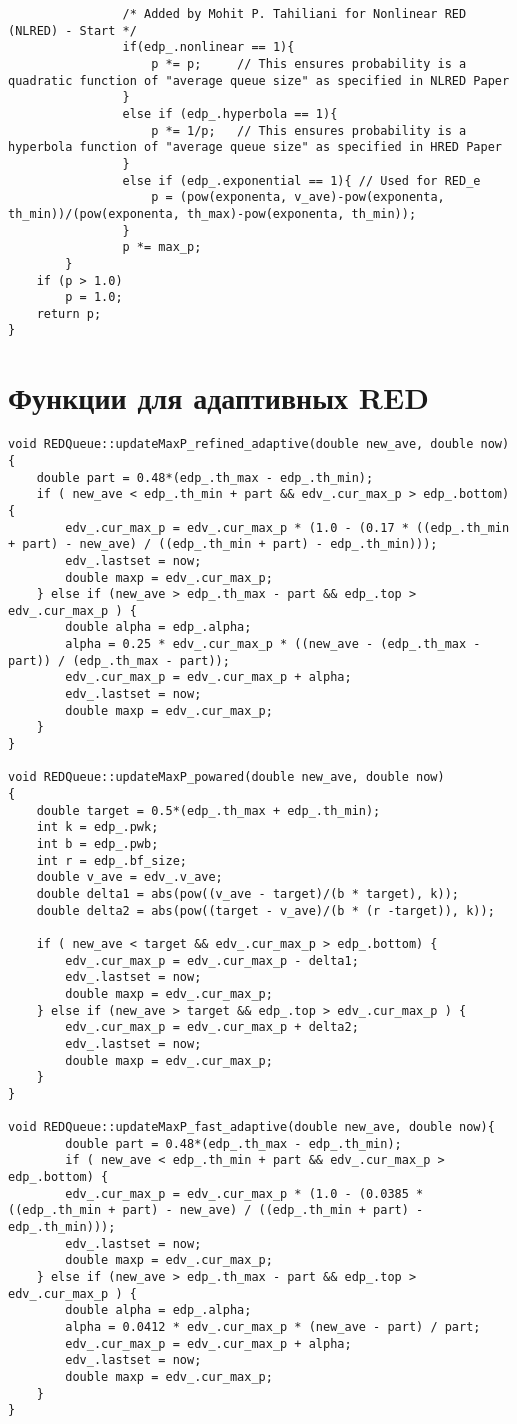 \begin{verbatim}
                /* Added by Mohit P. Tahiliani for Nonlinear RED (NLRED) - Start */
				if(edp_.nonlinear == 1){
					p *= p;		// This ensures probability is a quadratic function of "average queue size" as specified in NLRED Paper
				}
				else if (edp_.hyperbola == 1){
					p *= 1/p;	// This ensures probability is a hyperbola function of "average queue size" as specified in HRED Paper
				}
				else if (edp_.exponential == 1){ // Used for RED_e
					p = (pow(exponenta, v_ave)-pow(exponenta, th_min))/(pow(exponenta, th_max)-pow(exponenta, th_min));
				}
                p *= max_p; 
        }
	if (p > 1.0)
		p = 1.0;
	return p;
}
\end{verbatim}

\section{Функции для адаптивных RED}
\begin{verbatim}
void REDQueue::updateMaxP_refined_adaptive(double new_ave, double now)
{
  	double part = 0.48*(edp_.th_max - edp_.th_min);
 	if ( new_ave < edp_.th_min + part && edv_.cur_max_p > edp_.bottom) {
 		edv_.cur_max_p = edv_.cur_max_p * (1.0 - (0.17 * ((edp_.th_min + part) - new_ave) / ((edp_.th_min + part) - edp_.th_min))); 
 		edv_.lastset = now;
 		double maxp = edv_.cur_max_p;
 	} else if (new_ave > edp_.th_max - part && edp_.top > edv_.cur_max_p ) {
 		double alpha = edp_.alpha;
 		alpha = 0.25 * edv_.cur_max_p * ((new_ave - (edp_.th_max - part)) / (edp_.th_max - part));
 		edv_.cur_max_p = edv_.cur_max_p + alpha;
 		edv_.lastset = now;
 		double maxp = edv_.cur_max_p;
 	}
}

void REDQueue::updateMaxP_powared(double new_ave, double now)
{
  	double target = 0.5*(edp_.th_max + edp_.th_min);
  	int k = edp_.pwk;
  	int b = edp_.pwb;
  	int r = edp_.bf_size;
  	double v_ave = edv_.v_ave;
  	double delta1 = abs(pow((v_ave - target)/(b * target), k));
  	double delta2 = abs(pow((target - v_ave)/(b * (r -target)), k));
 	
 	if ( new_ave < target && edv_.cur_max_p > edp_.bottom) {
 		edv_.cur_max_p = edv_.cur_max_p - delta1; 
 		edv_.lastset = now;
 		double maxp = edv_.cur_max_p; 
 	} else if (new_ave > target && edp_.top > edv_.cur_max_p ) {
 		edv_.cur_max_p = edv_.cur_max_p + delta2;
 		edv_.lastset = now;
 		double maxp = edv_.cur_max_p;
 	}
}

void REDQueue::updateMaxP_fast_adaptive(double new_ave, double now){
	  	double part = 0.48*(edp_.th_max - edp_.th_min);
		if ( new_ave < edp_.th_min + part && edv_.cur_max_p > edp_.bottom) {
 		edv_.cur_max_p = edv_.cur_max_p * (1.0 - (0.0385 * ((edp_.th_min + part) - new_ave) / ((edp_.th_min + part) - edp_.th_min))); 
 		edv_.lastset = now;
 		double maxp = edv_.cur_max_p;
 	} else if (new_ave > edp_.th_max - part && edp_.top > edv_.cur_max_p ) {
 		double alpha = edp_.alpha;
 		alpha = 0.0412 * edv_.cur_max_p * (new_ave - part) / part;
 		edv_.cur_max_p = edv_.cur_max_p + alpha;
 		edv_.lastset = now;
 		double maxp = edv_.cur_max_p;
 	}
}
\end{verbatim}


